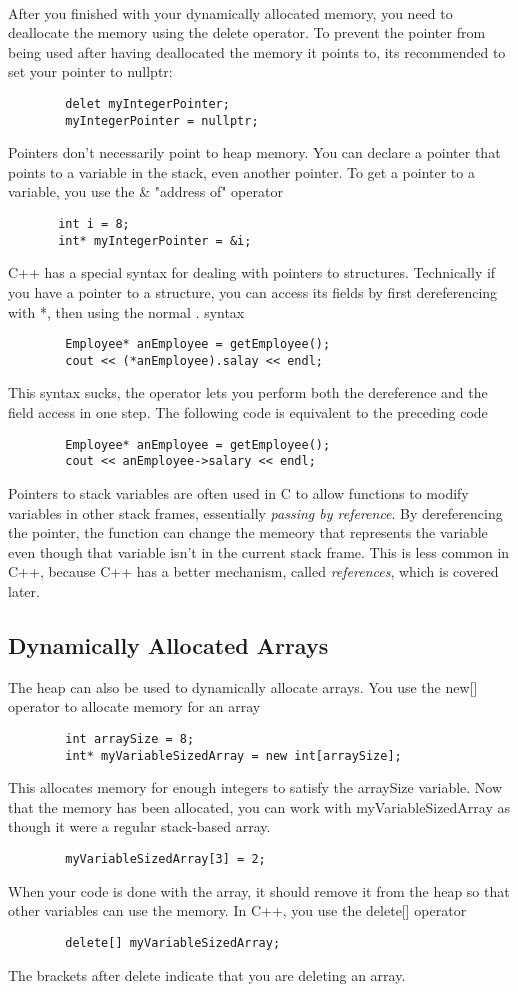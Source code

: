 \documentclass{article}
\begin{document}
\noindent \\ After you finished with your dynamically allocated memory, you need to deallocate the
memory using the delete operator. To prevent the pointer from being used after having deallocated the
memory it points to, its recommended to set your pointer to nullptr:
\begin{verbatim}
        delet myIntegerPointer;
        myIntegerPointer = nullptr;
\end{verbatim}
Pointers don't necessarily point to heap memory. You can declare a pointer that points to a variable
in the stack, even another pointer. To get a pointer to a variable, you use the \& "address of" operator
\begin{verbatim}
       int i = 8;
       int* myIntegerPointer = &i;
\end{verbatim}
C++ has a special syntax for dealing with pointers to structures. Technically if you have a pointer
to a structure, you can access its fields by first dereferencing with *, then using the normal .
syntax
\begin{verbatim}
        Employee* anEmployee = getEmployee();
        cout << (*anEmployee).salay << endl;
\end{verbatim}
This syntax sucks, the \-\> operator lets you perform both the dereference and the field access
in one step. The following code is equivalent to the preceding code
\begin{verbatim}
        Employee* anEmployee = getEmployee();
        cout << anEmployee->salary << endl;
\end{verbatim}
Pointers to stack variables are often used in C to allow functions to modify variables in other
stack frames, essentially \textit{passing by reference}. By dereferencing the pointer, the function
can change the memeory that represents the variable even though that variable isn't in the current
stack frame. This is less common in C++, because C++ has a better mechanism, called \textit{references},
which is covered later.
\subsection{Dynamically Allocated Arrays}
The heap can also be used to dynamically allocate arrays. You use the new[] operator to allocate
memory for an array
\begin{verbatim}
        int arraySize = 8;
        int* myVariableSizedArray = new int[arraySize];
\end{verbatim}
This allocates memory for enough integers to satisfy the arraySize variable. Now that the memory
has been allocated, you can work with myVariableSizedArray as though it were a regular stack-based
array.
\begin{verbatim}
        myVariableSizedArray[3] = 2;
\end{verbatim}
When your code is done with the array, it should remove it from the heap so that other variables
can use the memory. In C++, you use the delete[] operator
\begin{verbatim}
        delete[] myVariableSizedArray;
\end{verbatim}
The brackets after delete indicate that you are deleting an array.
\end{document}
